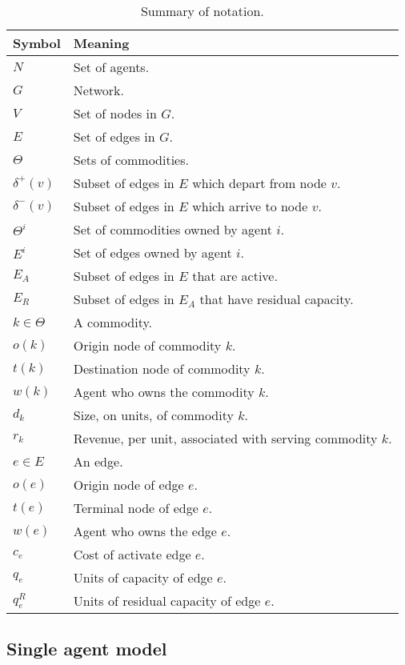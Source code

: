 \documentclass{article}
\begin{document}
\begin{table}[ht!]
	\caption{Summary of notation. \label{tb:notation}}
	\begin{tabular}{|l|l|}
	\hline
	Symbol & Meaning	 \\ \hline
	$N$ & Set of agents. \\
	$G$ & Network. \\
	$V$ & Set of nodes in $G$. \\
	$E$ & Set of edges in $G$. \\
	$\Theta$ & Sets of commodities. \\
	$\delta^+(v)$ & Subset of edges in $E$ which depart from node $v$.\\
	$\delta^-(v)$ & Subset of edges in $E$ which arrive to node $v$.\\	
	$\Theta^i$ & Set of commodities owned by agent $i$. \\	
	$E^i$ & Set of edges owned by agent $i$.\\
	$E_A$ & Subset of edges in $E$ that are active. \\
	$E_R$ & Subset of edges in $E_A$ that have residual capacity.\\
	$k \in \Theta$ & A commodity.\\
	$o(k)$ & Origin node of commodity $k$.\\
	$t(k)$ & Destination node of commodity $k$.\\
	$w(k)$ & Agent who owns the commodity $k$.\\
	$d_k$ & Size, on units, of commodity $k$.\\
	$r_k$ & Revenue, per unit, associated with serving commodity $k$.\\
	$e\in E$ & An edge.\\
	$o(e)$ & Origin node of edge $e$.\\
	$t(e)$ & Terminal node of edge $e$.\\
	$w(e)$ & Agent who owns the edge $e$.\\
	$c_e$ & Cost of activate edge $e$. \\
	$q_e$ & Units of capacity of edge $e$. \\
	$q_e^R$ & Units of residual capacity of edge $e$.\\
	\hline
	\end{tabular}
\end{table}

\subsection{Single agent model}
\end{document}
